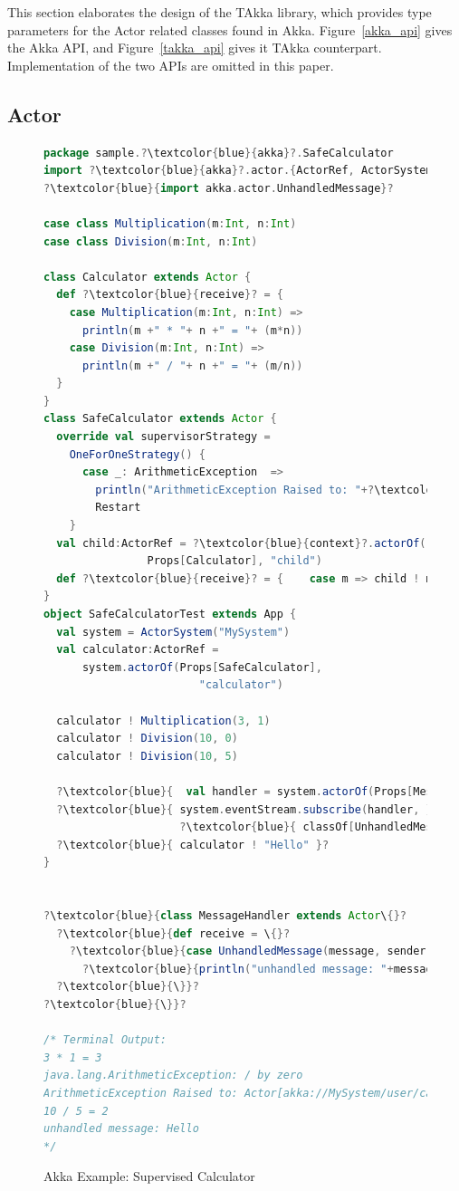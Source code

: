This section elaborates the design of the TAkka library, which provides type 
parameters for the Actor related classes found in Akka.  Figure~\ref{akka_api}
gives the Akka API, and Figure~\ref{takka_api} gives it TAkka counterpart.
Implementation of the two APIs are omitted in this paper.

\subsection{Actor}

\begin{figure}[p]

  \begin{lstlisting}[language=scala,   escapechar=?]
package sample.?\textcolor{blue}{akka}?.SafeCalculator
import ?\textcolor{blue}{akka}?.actor.{ActorRef, ActorSystem, Props, Actor}
?\textcolor{blue}{import akka.actor.UnhandledMessage}?

case class Multiplication(m:Int, n:Int)
case class Division(m:Int, n:Int)

class Calculator extends Actor {
  def ?\textcolor{blue}{receive}? = {
    case Multiplication(m:Int, n:Int) =>
      println(m +" * "+ n +" = "+ (m*n))
    case Division(m:Int, n:Int) =>
      println(m +" / "+ n +" = "+ (m/n))
  }
}
class SafeCalculator extends Actor {
  override val supervisorStrategy =
    OneForOneStrategy() {
      case _: ArithmeticException  =>
        println("ArithmeticException Raised to: "+?\textcolor{blue}{self}?)
        Restart
    }
  val child:ActorRef = ?\textcolor{blue}{context}?.actorOf(
  				Props[Calculator], "child")
  def ?\textcolor{blue}{receive}? = {    case m => child ! m  }
}
object SafeCalculatorTest extends App {
  val system = ActorSystem("MySystem")
  val calculator:ActorRef = 
      system.actorOf(Props[SafeCalculator],
                        "calculator")

  calculator ! Multiplication(3, 1)
  calculator ! Division(10, 0)
  calculator ! Division(10, 5)
  
  ?\textcolor{blue}{  val handler = system.actorOf(Props[MessageHandler])}?
  ?\textcolor{blue}{ system.eventStream.subscribe(handler, }?
                     ?\textcolor{blue}{ classOf[UnhandledMessage]);  }?
  ?\textcolor{blue}{ calculator ! "Hello" }?
}


?\textcolor{blue}{class MessageHandler extends Actor\{}?
  ?\textcolor{blue}{def receive = \{}?
    ?\textcolor{blue}{case UnhandledMessage(message, sender, recipient) =>}?
      ?\textcolor{blue}{println("unhandled message: "+message);}?
  ?\textcolor{blue}{\}}?
?\textcolor{blue}{\}}?

/* Terminal Output:
3 * 1 = 3
java.lang.ArithmeticException: / by zero
ArithmeticException Raised to: Actor[akka://MySystem/user/calculator]
10 / 5 = 2
unhandled message: Hello
*/


    \end{lstlisting}
  \caption{Akka Example: Supervised Calculator}
  \vspace*{2 in}
  \label{akka:supervisedcalculator}
\end{figure}


